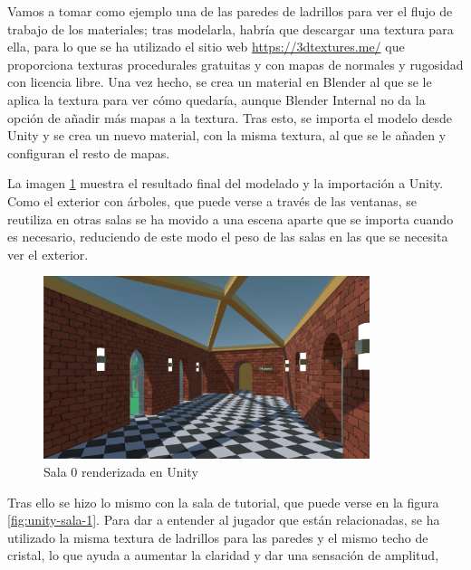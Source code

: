 Vamos a tomar como ejemplo una de las paredes de ladrillos para ver el flujo de trabajo de los materiales; tras modelarla, habría que descargar una textura para ella, para lo que se ha utilizado el sitio web \url{https://3dtextures.me/} que proporciona texturas procedurales gratuitas y con mapas de normales y rugosidad con licencia libre. Una vez hecho, se crea un material en Blender al que se le aplica la textura para ver cómo quedaría, aunque Blender Internal no da la opción de añadir más mapas a la textura. Tras esto, se importa el modelo desde Unity y se crea un nuevo material, con la misma textura, al que se le añaden y configuran el resto de mapas.

La imagen \ref{fig:unity-sala-0} muestra el resultado final del modelado y la importación a Unity. Como el exterior con árboles, que puede verse a través de las ventanas, se reutiliza en otras salas se ha movido a una escena aparte que se importa cuando es necesario, reduciendo de este modo el peso de las salas en las que se necesita ver el exterior.

\begin{figure}[!h]
\begin{center}
\includegraphics[width=0.85\textwidth]{imagenes/7/salas-unity/unity-sala-0.png}
\caption{Sala 0 renderizada en Unity}
\label{fig:unity-sala-0}
\end{center}
\end{figure}

Tras ello se hizo lo mismo con la sala de tutorial, que puede verse en la figura \ref{fig:unity-sala-1}. Para dar a entender al jugador que están relacionadas, se ha utilizado la misma textura de ladrillos para las paredes y el mismo techo de cristal, lo que ayuda a aumentar la claridad y dar una sensación de amplitud,

